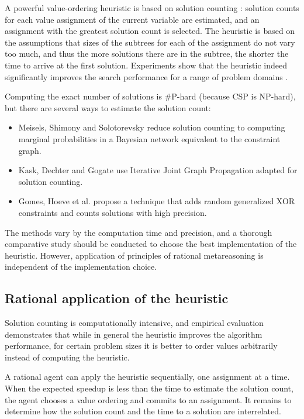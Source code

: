 A powerful value-ordering heuristic is based on solution counting
\cite{Meisels.solcount}: solution counts for each value
assignment of the current variable are estimated, and an assignment
with the greatest solution count is selected. The heuristic is based
on the assumptions that sizes of the subtrees for each of the
assignment do not vary too much, and thus the more solutions there are
in the subtree, the shorter the time to arrive at the first solution.
Experiments show that the heuristic indeed significantly improves the
search performance for a range of problem domains
\cite{Meisels.solcount}\cite{Kask.solcount}.

Computing the exact number of solutions is \#P-hard (because CSP is
NP-hard), but there are several ways to estimate the solution count:
\begin{itemize}
  \item Meisels, Shimony and Solotorevsky \cite{Meisels.solcount}
        reduce solution counting to computing marginal probabilities in a
        Bayesian network equivalent to the constraint graph.
  \item Kask, Dechter and Gogate \cite{Kask.solcount} use Iterative
        Joint Graph Propagation adapted for solution counting.
  \item Gomes, Hoeve et al. \cite{Gomes.solcount} propose a technique
        that adds random generalized XOR constraints and counts solutions with
        high precision.
\end{itemize}
The methods vary by the computation time and precision, and a
thorough comparative study should be conducted to choose the best
implementation of the heuristic. However, application of principles of
rational metareasoning is independent of the implementation choice.

\subsection{Rational application of the heuristic}
\label{sec:app-csp-rational}

Solution counting is computationally intensive, and empirical evaluation
\cite{Kask.solcount} demonstrates that while in general the heuristic
improves the algorithm performance, for certain problem sizes it is
better to order values arbitrarily instead of computing the heuristic.

A rational agent can apply the heuristic sequentially, one assignment
at a time. When the expected speedup is less than the time to estimate
the solution count, the agent chooses a value ordering and commits to
an assignment. It remains to determine how the solution count and the
time to a solution are interrelated.

